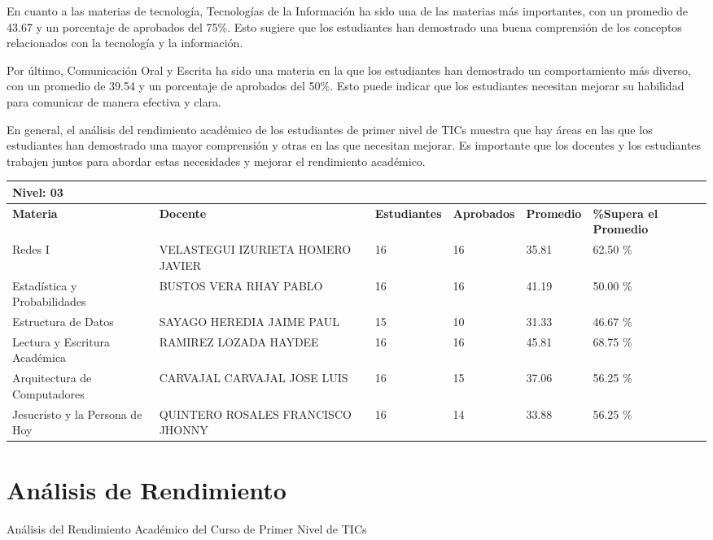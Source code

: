 En cuanto a las materias de tecnología, Tecnologías de la Información ha sido una de las materias más importantes, con un promedio de 43.67 y un porcentaje de aprobados del 75\%. Esto sugiere que los estudiantes han demostrado una buena comprensión de los conceptos relacionados con la tecnología y la información.

Por último, Comunicación Oral y Escrita ha sido una materia en la que los estudiantes han demostrado un comportamiento más diverso, con un promedio de 39.54 y un porcentaje de aprobados del 50\%. Esto puede indicar que los estudiantes necesitan mejorar su habilidad para comunicar de manera efectiva y clara.

En general, el análisis del rendimiento académico de los estudiantes de primer nivel de TICs muestra que hay áreas en las que los estudiantes han demostrado una mayor comprensión y otras en las que necesitan mejorar. Es importante que los docentes y los estudiantes trabajen juntos para abordar estas necesidades y mejorar el rendimiento académico.\\
\vspace{1cm}\small
\begin{tabularx}{\textwidth}{|p{2.5cm}|p{2.5cm}|X|X|X|X|}
\hline
\multicolumn{6}{|X|}{\textbf{Nivel: 03 }}\\\hline\textbf{Materia} & \textbf{Docente} & \textbf{Estudiantes} & \textbf{Aprobados} & \textbf{Promedio} & \textbf{\%Supera el Promedio} \\ \hline
Redes I & VELASTEGUI IZURIETA HOMERO JAVIER & 16 & 16 & 35.81 & 62.50 \%\\ \hline
Estadística y Probabilidades & BUSTOS VERA RHAY PABLO & 16 & 16 & 41.19 & 50.00 \%\\ \hline
Estructura de Datos & SAYAGO HEREDIA JAIME PAUL & 15 & 10 & 31.33 & 46.67 \%\\ \hline
Lectura y Escritura Académica & RAMIREZ LOZADA HAYDEE  & 16 & 16 & 45.81 & 68.75 \%\\ \hline
Arquitectura de Computadores & CARVAJAL CARVAJAL JOSE LUIS & 16 & 15 & 37.06 & 56.25 \%\\ \hline
Jesucristo y la Persona de Hoy & QUINTERO ROSALES FRANCISCO JHONNY & 16 & 14 & 33.88 & 56.25 \%\\ \hline
\end{tabularx}

\vspace{1cm}
\section{Análisis de Rendimiento}
Análisis del Rendimiento Académico del Curso de Primer Nivel de TICs

